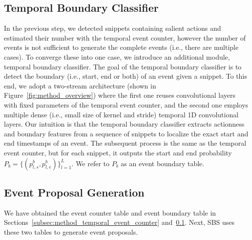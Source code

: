 \subsection{Temporal Boundary Classifier}
\label{subsec:method_temporal_boundary_classifier}

In the previous step, we detected snippets containing salient actions and estimated their number with the temporal event counter, however the number of events is not sufficient to generate the complete events (i.e., there are multiple cases).
To converge these into one case, we introduce an additional module, temporal boundary classifier.
The goal of the temporal boundary classifier is to detect the boundary (i.e., start, end or both) of an event given a snippet.
To this end, we adopt a two-stream architecture (shown in Figure~\ref{fig:method_overview}) where the first one reuses convolutional layers with fixed parameters of the temporal event counter, and the second one employs multiple dense (i.e., small size of kernel and stride) temporal 1D convolutional layers.
Our intuition is that the temporal boundary classifier extracts actionness and boundary features from a sequence of snippets to localize the exact start and end timestamps of an event.
The subsequent process is the same as the temporal event counter, but for each snippet, it outputs the start and end probability $P_b = \{(p_{l,s}^b, p_{l,e}^b)\}_{l=1}^{L}$.
We refer to $P_b$ as an event boundary table.

\subsection{Event Proposal Generation}%
\label{subsec:method_event_proposal_generation}
We have obtained the event counter table and event boundary table in Sections~\ref{subsec:method_temporal_event_counter} and~\ref{subsec:method_temporal_boundary_classifier}.
Next, SBS uses these two tables to generate event proposals.

